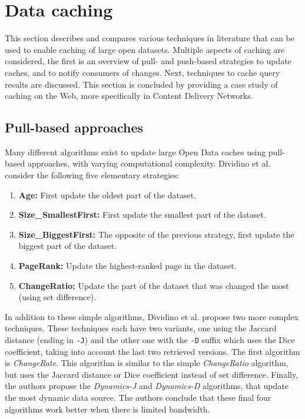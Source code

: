 \section{Data caching}\label{sec:caching}
This section describes and compares various techniques in literature that can be used to enable caching of large open datasets. Multiple aspects of caching are considered, the first is an overview of pull- and push-based strategies to update caches, and to notify consumers of changes. Next, techniques to cache query results are discussed. This section is concluded by providing a case study of caching on the Web, more specifically in Content Delivery Networks.

\subsection{Pull-based approaches}\label{ssec:caching-pullbased}
Many different algorithms exist to update large Open Data caches using pull-based approaches, with varying computational complexity. Dividino et al. \cite{ISI:000374242500024} consider the following five elementary strategies: 

\begin{enumerate}
    \item \textbf{Age:} First update the oldest part of the dataset.
    
    \item \textbf{Size\_SmallestFirst:} First update the smallest part of the dataset.
    
    \item \textbf{Size\_BiggestFirst:} The opposite of the previous strategy, first update the biggest part of the dataset.
    
    \item \textbf{PageRank:} Update the highest-ranked page in the dataset.
    
    \item \textbf{ChangeRatio:} Update the part of the dataset that was changed the most (using set difference).
\end{enumerate}

\noindent In addition to these simple algorithms, Dividino et al. \cite{ISI:000374242500024} propose two more complex techniques. These techniques each have two variants, one using the Jaccard distance (ending in \texttt{-J}) and the other one with the \texttt{-D} suffix which uses the Dice coefficient, taking into account the last two retrieved versions. The first algorithm is \emph{ChangeRate}. This algorithm is similar to the simple \emph{ChangeRatio} algorithm, but uses the Jaccard distance or Dice coefficient instead of set difference. Finally, the authors propose the \emph{Dynamics-J} and \emph{Dynamics-D} algorithms, that update the most dynamic data source. The authors conclude that these final four algorithms work better when there is limited bandwidth.\\

